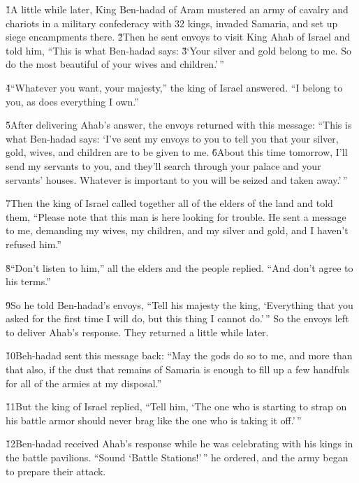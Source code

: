 \v{1}A little while later, King Ben-hadad of Aram mustered an army of cavalry and chariots in a military confederacy with 32 kings, invaded Samaria, and set up siege encampments there. \v{2}Then he sent envoys to visit King Ahab of Israel and told him, ``This is what Ben-hadad says: \v{3}`Your silver and gold belong to me. So do the most beautiful of your wives and children.'\,''

\v{4}``Whatever you want, your majesty,'' the king of Israel answered. ``I belong to you, as does everything I own.''

\v{5}After delivering Ahab's answer, the envoys returned with this message: ``This is what Ben-hadad says: `I've sent my envoys to you to tell you that your silver, gold, wives, and children are to be given to me. \v{6}About this time tomorrow, I'll send my servants to you, and they'll search through your palace and your servants' houses. Whatever is important to you will be seized and taken away.'\,''

\v{7}Then the king of Israel called together all of the elders of the land and told them, ``Please note that this man is here looking for trouble. He sent a message to me, demanding my wives, my children, and my silver and gold, and I haven't refused him.''

\v{8}``Don't listen to him,'' all the elders and the people replied. ``And don't agree to his terms.''

\v{9}So he told Ben-hadad's envoys, ``Tell his majesty the king, `Everything that you asked for the first time I will do, but this thing I cannot do.'\,'' So the envoys left to deliver Ahab's response. They returned a little while later.

\v{10}Beh-hadad sent this message back: ``May the gods do so to me, and more than that also, if the dust that remains of Samaria is enough to fill up a few handfuls for all of the armies at my disposal.''

\v{11}But the king of Israel replied, ``Tell him, `The one who is starting to strap on his battle armor should never brag like the one who is taking it off.'\,''

\v{12}Ben-hadad received Ahab's response while he was celebrating with his kings in the battle pavilions. ``Sound `Battle Stations!'\,'' he ordered, and the army began to prepare their attack.

